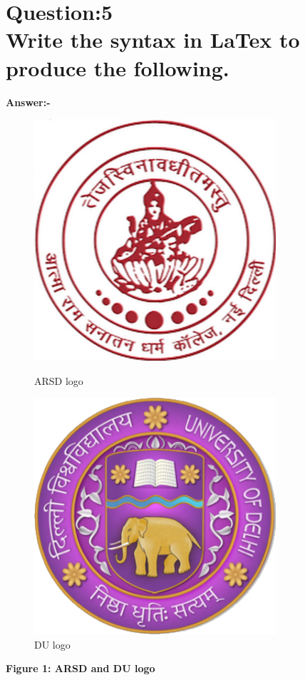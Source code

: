 \newpage
\section*{Question:5 \\ Write the syntax in LaTex to produce the following.}
\textbf{Answer:-}\\
\vspace{0.5cm}
\begin{figure}[h!]
    \centering
   

\begin{minipage}{0.48\textwidth}
        \centering
        \includegraphics[width= 0.8\textwidth]{Questions/pictures/logoc.jpg}
        \caption{ARSD logo}
\end{minipage}
\hfill
\begin{minipage}{0.48\textwidth}
        \centering
        \includegraphics[width= 0.8\textwidth]{Questions/pictures/logou.png}
        \caption{DU logo}
\end{minipage}
\end{figure}

\bigskip
\centering
\textbf{Figure 1: ARSD and DU logo}